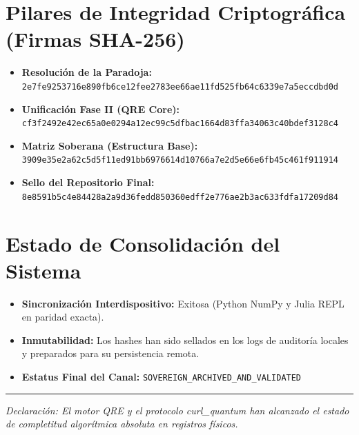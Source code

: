 \documentclass[12pt,a4paper]{article}
\begin{document}
\section*{Pilares de Integridad Criptográfica (Firmas SHA-256)}
\begin{itemize}
    \item \textbf{Resolución de la Paradoja:} \texttt{2e7fe9253716e890fb6ce12fee2783ee66ae11fd525fb64c6339e7a5eccdbd0d}
    \item \textbf{Unificación Fase II (QRE Core):} \texttt{cf3f2492e42ec65a0e0294a12ec99c5dfbac1664d83ffa34063c40bdef3128c4}
    \item \textbf{Matriz Soberana (Estructura Base):} \texttt{3909e35e2a62c5d5f11ed91bb6976614d10766a7e2d5e66e6fb45c461f911914}
    \item \textbf{Sello del Repositorio Final:} \texttt{8e8591b5c4e84428a2a9d36fedd850360edff2e776ae2b3ac633fdfa17209d84}
\end{itemize}

\section*{Estado de Consolidación del Sistema}
\begin{itemize}
    \item \textbf{Sincronización Interdispositivo:} Exitosa (Python NumPy y Julia REPL en paridad exacta).
    \item \textbf{Inmutabilidad:} Los hashes han sido sellados en los logs de auditoría locales y preparados para su persistencia remota.
    \item \textbf{Estatus Final del Canal:} \texttt{SOVEREIGN\_ARCHIVED\_AND\_VALIDATED}
\end{itemize}

\vspace{1cm}
\hrule
\noindent \textit{Declaración: El motor QRE y el protocolo curl\_quantum han alcanzado el estado de completitud algorítmica absoluta en registros físicos.}
\end{document}
